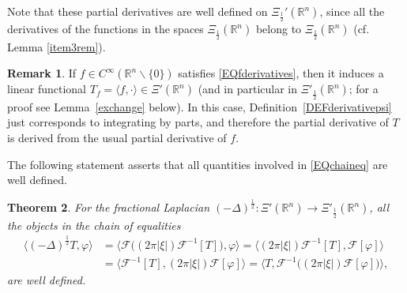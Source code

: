 \documentclass[reqno,11pt]{amsart}
\newtheorem{theorem}{Theorem}[section]
\theoremstyle{definition}
\newtheorem{remark}[theorem]{Remark}
\def\R{\mathbb{R}}
\begin{document}
Note that these partial derivatives are well defined on $\Xi_\frac{1}{2}'(\R^n)$, since all the derivatives of the functions in the spaces $\Xi_\frac{1}{2}(\R^n)$ belong to $\Xi_\frac{1}{2}(\R^n)$ (cf. Lemma \ref{item3rem}).
\begin{remark}
If $f\in C^\infty(\R^n\backslash\{0\})$ satisfies \eqref{EQfderivatives}, then it induces a linear functional $T_f=\langle f,\cdot\rangle\in \Xi'(\R^n)$ (and in particular in $\Xi'_{\frac{1}{2}}(\R^n)$; for a proof see Lemma~\ref{exchange} below). In this case, Definition~\ref{DEFderivativepsi} just corresponds to integrating by parts, and therefore the partial derivative of $T$ is derived from the usual partial derivative of $f$.
\end{remark}






The following statement asserts that all quantities involved in \eqref{EQchaineq} are well defined.

\begin{theorem}\label{IN QUESTO TEOR}
	For the fractional Laplacian $(-\Delta)^{\frac{1}{2}}:\Xi'(\R^n)\to \Xi'_\frac{1}{2}(\R^n)$, all the objects in the chain of equalities
	\begin{align*}
		\big\langle (-\Delta)^{\frac{1}{2}}T ,\varphi  \big\rangle & = 	\big\langle \mathcal{F}\big((2 \pi |\xi|)\mathcal{F}^{-1}[T]) ,\varphi  \big\rangle = 	\big\langle (2 \pi |\xi|)\mathcal{F}^{-1}[T] ,\mathcal{F}[\varphi ] \big\rangle \nonumber \\
		& = \big\langle \mathcal{F}^{-1}[T] ,(2 \pi  |\xi|)\mathcal{F}[\varphi ] \big\rangle = \big\langle T , \mathcal{F}^{-1} \big( (2 \pi |\xi|)\mathcal{F}[\varphi ]\big) \big\rangle,
	\end{align*}
	are well defined.
\end{theorem}
\end{document}
